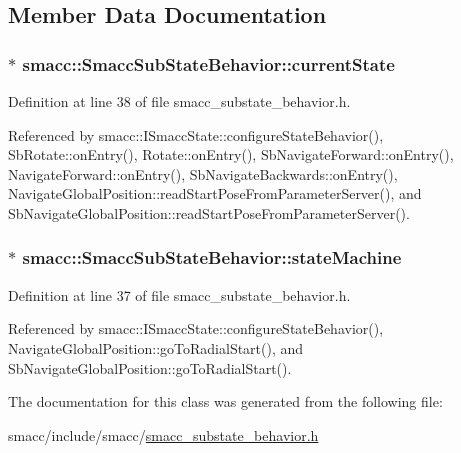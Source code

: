 \subsection{Member Data Documentation}
\subsubsection[{\texorpdfstring{current\+State}{currentState}}]{$\ast$ smacc\+::\+Smacc\+Sub\+State\+Behavior\+::current\+State}\hypertarget{classsmacc_1_1SmaccSubStateBehavior_a62e2b9da4a446f09396d0b4c01659b88}{}\label{classsmacc_1_1SmaccSubStateBehavior_a62e2b9da4a446f09396d0b4c01659b88}


Definition at line 38 of file smacc\+\_\+substate\+\_\+behavior.\+h.



Referenced by smacc\+::\+I\+Smacc\+State\+::configure\+State\+Behavior(), Sb\+Rotate\+::on\+Entry(), Rotate\+::on\+Entry(), Sb\+Navigate\+Forward\+::on\+Entry(), Navigate\+Forward\+::on\+Entry(), Sb\+Navigate\+Backwards\+::on\+Entry(), Navigate\+Global\+Position\+::read\+Start\+Pose\+From\+Parameter\+Server(), and Sb\+Navigate\+Global\+Position\+::read\+Start\+Pose\+From\+Parameter\+Server().

\subsubsection[{\texorpdfstring{state\+Machine}{stateMachine}}]{$\ast$ smacc\+::\+Smacc\+Sub\+State\+Behavior\+::state\+Machine}\hypertarget{classsmacc_1_1SmaccSubStateBehavior_ae3ff8a316bdd4bc5b7fee59d19464609}{}\label{classsmacc_1_1SmaccSubStateBehavior_ae3ff8a316bdd4bc5b7fee59d19464609}


Definition at line 37 of file smacc\+\_\+substate\+\_\+behavior.\+h.



Referenced by smacc\+::\+I\+Smacc\+State\+::configure\+State\+Behavior(), Navigate\+Global\+Position\+::go\+To\+Radial\+Start(), and Sb\+Navigate\+Global\+Position\+::go\+To\+Radial\+Start().



The documentation for this class was generated from the following file\+:\begin{DoxyCompactItemize}
\item 
smacc/include/smacc/\hyperlink{smacc__substate__behavior_8h}{smacc\+\_\+substate\+\_\+behavior.\+h}\end{DoxyCompactItemize}
